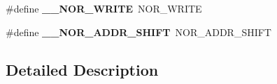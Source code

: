 \begin{DoxyCompactItemize}
\item 
\hypertarget{group___h_a_l___n_o_r___aliased___defines_ga7b65a23e48189016e4f22ba4b84773ad}{\#define {\bfseries \-\_\-\-\_\-\-N\-O\-R\-\_\-\-W\-R\-I\-T\-E}~N\-O\-R\-\_\-\-W\-R\-I\-T\-E}\label{group___h_a_l___n_o_r___aliased___defines_ga7b65a23e48189016e4f22ba4b84773ad}

\item 
\hypertarget{group___h_a_l___n_o_r___aliased___defines_ga0fbcfd18de611ae4687a6bc41f427249}{\#define {\bfseries \-\_\-\-\_\-\-N\-O\-R\-\_\-\-A\-D\-D\-R\-\_\-\-S\-H\-I\-F\-T}~N\-O\-R\-\_\-\-A\-D\-D\-R\-\_\-\-S\-H\-I\-F\-T}\label{group___h_a_l___n_o_r___aliased___defines_ga0fbcfd18de611ae4687a6bc41f427249}

\end{DoxyCompactItemize}


\subsection{Detailed Description}
